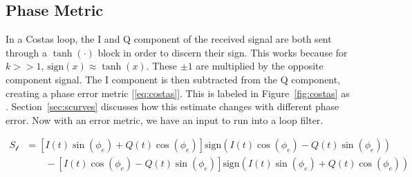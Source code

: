 \documentclass[]{article}
\newcommand{\rom}[1]{\uppercase\expandafter{\romannumeral#1}}
\begin{document}
\subsection{Phase Metric}
\label{sec:phaseMetric} 
In a Costas loop, the I and Q component of the received signal are both sent through a $\tanh\left(\cdot\right)$ block in order to discern their sign.  This works because for $k>>1$, $\text{sign}\left(x\right) \approx \tanh \left(x\right)$.  These $\pm1$ are multiplied by the opposite component signal.  The I component is then subtracted from the Q component, creating a phase error metric [\ref{eq:costas}].  This is labeled in Figure~\ref{fig:costas} as \rom{1}.  Section~\ref{sec:scurves} discusses how this estimate changes with different phase error.  Now with an error metric, we have an input to run into a loop filter. 

  \begin{align}
  \label{eq:costas}
  S_{\mathcal{l}} &= \left[I\left(t\right)\sin\left(\phi_e\right)+Q\left(t\right)\cos\left(\phi_e\right)\right]\text{sign}\left(I\left(t\right)\cos\left(\phi_e\right)- Q\left(t\right)\sin\left(\phi_e\right)\right)\nonumber \\
  &\qquad {} - \left[I\left(t\right)\cos\left(\phi_e\right)-Q\left(t\right)\sin\left(\phi_e\right)\right]\text{sign}\left(I\left(t\right)\sin\left(\phi_e\right)+Q\left(t\right)\cos\left(\phi_e\right)\right)
  \end{align}
  
\end{document}
